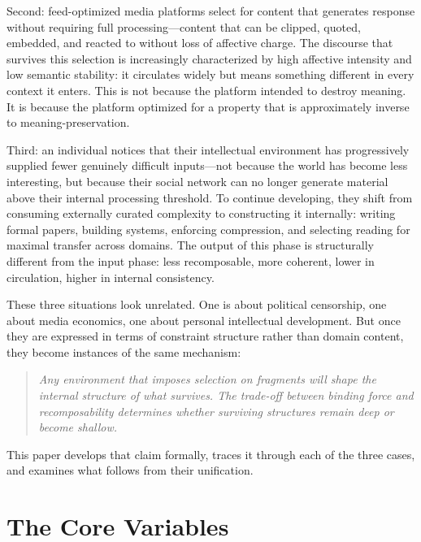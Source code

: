 \documentclass[12pt]{article}
\begin{document}
Second: feed-optimized media platforms select for content that generates
response without requiring full processing---content that can be clipped,
quoted, embedded, and reacted to without loss of affective charge. The
discourse that survives this selection is increasingly characterized by
high affective intensity and low semantic stability: it circulates widely
but means something different in every context it enters. This is not
because the platform intended to destroy meaning. It is because the
platform optimized for a property that is approximately inverse to
meaning-preservation.

Third: an individual notices that their intellectual environment has
progressively supplied fewer genuinely difficult inputs---not because the
world has become less interesting, but because their social network can
no longer generate material above their internal processing threshold.
To continue developing, they shift from consuming externally curated
complexity to constructing it internally: writing formal papers, building
systems, enforcing compression, and selecting reading for maximal
transfer across domains. The output of this phase is structurally
different from the input phase: less recomposable, more coherent, lower
in circulation, higher in internal consistency.

These three situations look unrelated. One is about political censorship,
one about media economics, one about personal intellectual development.
But once they are expressed in terms of constraint structure rather than
domain content, they become instances of the same mechanism:

\begin{quote}
\emph{Any environment that imposes selection on fragments will shape the
internal structure of what survives. The trade-off between binding force
and recomposability determines whether surviving structures remain deep
or become shallow.}
\end{quote}

This paper develops that claim formally, traces it through each of the
three cases, and examines what follows from their unification.

\section{The Core Variables}
\label{sec:variables}
\end{document}
